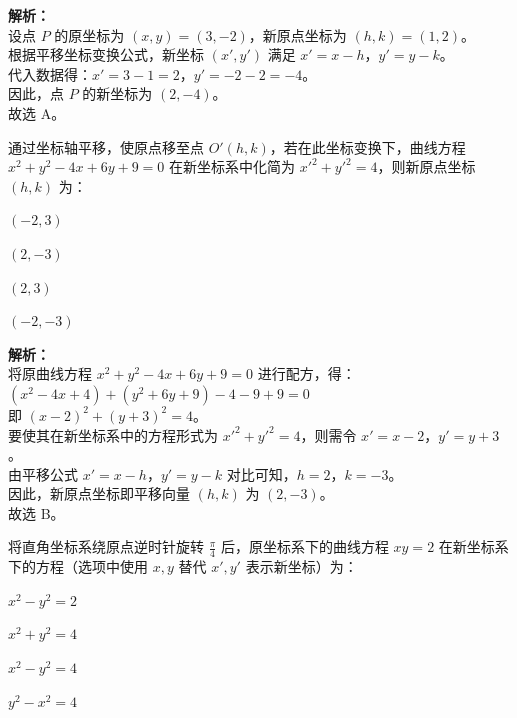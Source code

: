 \documentclass[12pt,a4paper]{exam-zh}
\begin{document}
\begin{solution}
    \textbf{解析：} \\
    设点 $P$ 的原坐标为 $(x, y) = (3, -2)$，新原点坐标为 $(h, k) = (1, 2)$。 \\
    根据平移坐标变换公式，新坐标 $(x', y')$ 满足 $x' = x - h$，$y' = y - k$。 \\
    代入数据得：$x' = 3 - 1 = 2$，$y' = -2 - 2 = -4$。 \\
    因此，点 $P$ 的新坐标为 $(2, -4)$。 \\
    故选 A。
\end{solution}

\begin{question}
    通过坐标轴平移，使原点移至点 $O'(h, k)$，若在此坐标变换下，曲线方程 $x^2 + y^2 - 4x + 6y + 9 = 0$ 在新坐标系中化简为 $x'^2 + y'^2 = 4$，则新原点坐标 $(h, k)$ 为： \paren[B]
    \begin{choices}
        \item $(-2, 3)$ \item $(2, -3)$ \item $(2, 3)$ \item $(-2, -3)$
    \end{choices}
\end{question}

\begin{solution}
    \textbf{解析：} \\
    将原曲线方程 $x^2 + y^2 - 4x + 6y + 9 = 0$ 进行配方，得： \\
    $(x^2 - 4x + 4) + (y^2 + 6y + 9) - 4 - 9 + 9 = 0$ \\
    即 $(x - 2)^2 + (y + 3)^2 = 4$。 \\
    要使其在新坐标系中的方程形式为 $x'^2 + y'^2 = 4$，则需令 $x' = x - 2$，$y' = y + 3$。 \\
    由平移公式 $x' = x - h$，$y' = y - k$ 对比可知，$h = 2$，$k = -3$。 \\
    因此，新原点坐标即平移向量 $(h, k)$ 为 $(2, -3)$。 \\
    故选 B。
\end{solution}

\begin{question}
    将直角坐标系绕原点逆时针旋转 $\frac{\pi}{4}$ 后，原坐标系下的曲线方程 $xy = 2$ 在新坐标系下的方程（选项中使用 $x, y$ 替代 $x', y'$ 表示新坐标）为： \paren[C]
    \begin{choices}
        \item $x^2 - y^2 = 2$ \item $x^2 + y^2 = 4$ \item $x^2 - y^2 = 4$ \item $y^2 - x^2 = 4$
    \end{choices}
\end{question}
\end{document}
